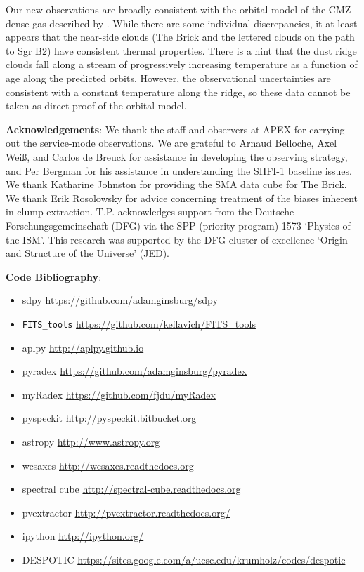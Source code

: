 Our new observations are broadly consistent with the orbital model of the CMZ
dense gas described by \citet{Kruijssen2015a}.  While there are some individual
discrepancies, it at least appears that the near-side clouds (The Brick and the
lettered clouds on the path to Sgr B2) have consistent thermal properties.
There is a hint that the dust ridge clouds fall along a stream of progressively
increasing temperature as a function of age along the predicted orbits.  However,
the observational uncertainties are consistent with a constant temperature along
the ridge, so these data cannot be taken as direct proof of the orbital model.


\textbf{Acknowledgements}:
We thank the staff and observers at APEX for carrying out the service-mode
observations.  We are grateful to Arnaud Belloche, Axel Weiß, and Carlos de
Breuck for assistance in developing the observing strategy, and Per Bergman for
his assistance in understanding the SHFI-1 baseline issues.
We thank Katharine Johnston for providing the SMA \para \threetwoone
data cube for The Brick.
We thank Erik Rosolowsky for advice concerning treatment of the biases inherent
in clump extraction.  T.P. acknowledges support from the Deutsche
Forschungsgemeinschaft (DFG) via
the SPP (priority program) 1573 ‘Physics of the ISM’.
This research was supported by the DFG cluster of excellence `Origin and
Structure of the Universe' (JED).

\textbf{Code Bibliography}:

\begin{itemize}
    \item sdpy \url{https://github.com/adamginsburg/sdpy}
    \item \texttt{FITS\_tools} \url{https://github.com/keflavich/FITS_tools}
    \item aplpy \url{http://aplpy.github.io}
    \item pyradex \url{https://github.com/adamginsburg/pyradex}
    \item myRadex \url{https://github.com/fjdu/myRadex}
    \item pyspeckit \url{http://pyspeckit.bitbucket.org} \citep{Ginsburg2011c}
    \item astropy \url{http://www.astropy.org} \citep{Astropy-Collaboration2013a}
    \item wcsaxes \url{http://wcsaxes.readthedocs.org}
    \item spectral cube \url{http://spectral-cube.readthedocs.org}
    \item pvextractor \url{http://pvextractor.readthedocs.org/}
    \item ipython \url{http://ipython.org/} \citep{Perez2007a}
    \item DESPOTIC \url{https://sites.google.com/a/ucsc.edu/krumholz/codes/despotic} \citep{Krumholz2014c}
\end{itemize}


